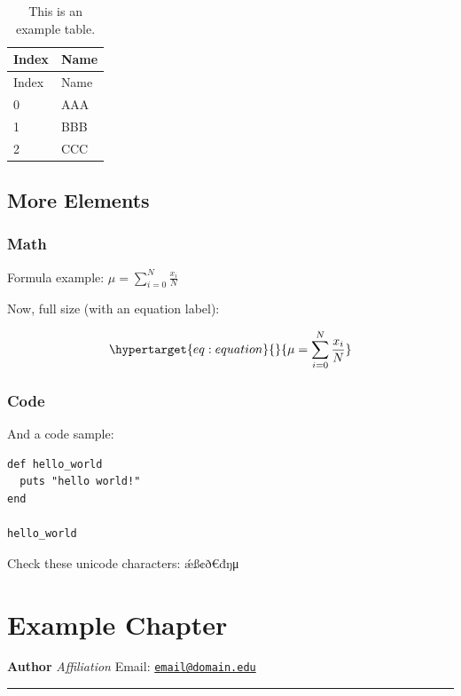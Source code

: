 \documentclass{book}
\begin{document}
\begin{longtable}[]{@{}ll@{}}
\caption{This is an example table.}\tabularnewline
\toprule
Index & Name \\
\midrule
\endfirsthead
\toprule
Index & Name \\
\midrule
\endhead
0 & AAA \\
1 & BBB \\
2 & CCC \\
\bottomrule
\end{longtable}

\hypertarget{more-elements}{%
\section{More Elements}\label{more-elements}}

\hypertarget{math-1}{%
\subsection{Math}\label{math-1}}

Formula example: \(\mu = \sum_{i=0}^{N} \frac{x_i}{N}\)

Now, full size (with an equation label):

\begin{equation}\protect\hypertarget{eq:equation}{}{\mu = \sum_{i=0}^{N} \frac{x_i}{N}}\label{eq:equation}\end{equation}

\hypertarget{code}{%
\subsection{Code}\label{code}}

And a code sample:

\begin{verbatim}
def hello_world
  puts "hello world!"
end

hello_world
\end{verbatim}

Check these unicode characters: ǽß¢ð€đŋμ

\hypertarget{example-chapter}{%
\chapter{Example Chapter}\label{example-chapter}}

\textbf{Author} \emph{Affiliation} Email:
\href{mailto:email@domain.edu}{\nolinkurl{email@domain.edu}}

\begin{center}\rule{0.5\linewidth}{0.5pt}\end{center}
\end{document}
